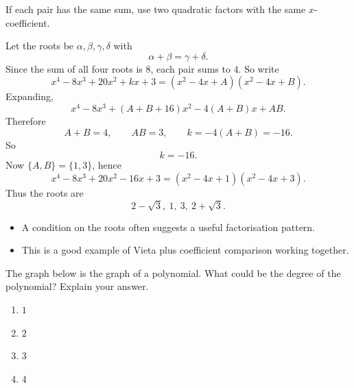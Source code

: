 \begin{hintbox}
If each pair has the same sum, use two quadratic factors with the same $x$-coefficient.
\end{hintbox}

\begin{solution}
Let the roots be $\alpha,\beta,\gamma,\delta$ with
\[
\alpha+\beta=\gamma+\delta.
\]
Since the sum of all four roots is $8$, each pair sums to $4$. So write
\[
x^4-8x^3+20x^2+kx+3=(x^2-4x+A)(x^2-4x+B).
\]
Expanding,
\[
x^4-8x^3+(A+B+16)x^2-4(A+B)x+AB.
\]
Therefore
\[
A+B=4,\qquad AB=3,\qquad k=-4(A+B)=-16.
\]
So
\[
\boxed{k=-16.}
\]
Now $\{A,B\}=\{1,3\}$, hence
\[
x^4-8x^3+20x^2-16x+3=(x^2-4x+1)(x^2-4x+3).
\]
Thus the roots are
\[
\boxed{2-\sqrt3,\ 1,\ 3,\ 2+\sqrt3.}
\]
\end{solution}

\begin{takeaways}
\begin{itemize}[leftmargin=*]
\item A condition on the roots often suggests a useful factorisation pattern.
\item This is a good example of Vieta plus coefficient comparison working together.
\end{itemize}
\end{takeaways}

\begin{problem}
The graph below is the graph of a polynomial.
What could be the degree of the polynomial? Explain your answer.

\begin{enumerate}[label=\textnormal{(\alph*)}]
\item $1$
\item $2$
\item $3$
\item $4$
\end{enumerate}

\begin{center}
\end{center}
\end{problem}

